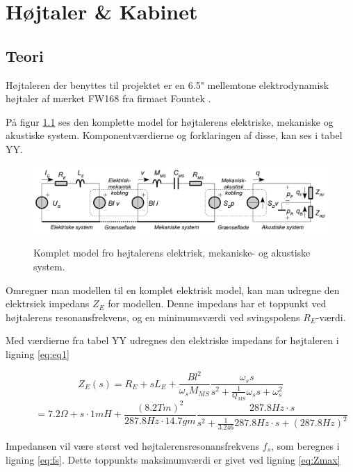 \chapter{Højtaler \& Kabinet}

\section{Teori}
Højtaleren der benyttes til projektet er en 6.5" mellemtone elektrodynamisk højtaler af mærket FW168\cite{FW168} fra firmaet Fountek \cite{Fountek}. 

På figur \ref{fig:kompletmodel} ses den komplette model for højtalerens elektriske, mekaniske og akustiske system.\citep{Elektroakustik} Komponentværdierne og forklaringen af disse, kan ses i tabel YY.

\begin{figure}[H]
	\centering
	\includegraphics[width=\textwidth]{Pics/kompletmodel.PNG}
	\label{fig:kompletmodel}
	\caption{Komplet model fro højtalerens elektrisk, mekaniske- og akustiske system. } 
\end{figure}

Omregner man modellen til en komplet elektrisk model, kan man udregne den elektrsiek impedans $Z_E$ for modellen. Denne impedans har et toppunkt ved højtalerens resonansfrekvens, og en minimumsværdi ved svingspolens $R_E$-værdi.

Med værdierne fra tabel YY udregnes den elektriske impedans for højtaleren i ligning \ref{eq:eq1}

\begin{equation}\label{eq:eq1}
Z_E(s)=R_E+sL_E+\frac{Bl^2}{\omega_s M_{MS}} \frac{ \omega_s s}{ s^2 + \frac{1}{Q_{MS}} \omega_s s + \omega_s^2} \end{equation} \begin{equation} \ \qquad  = 
7.2\Omega + s \cdot 1mH + \frac{(8.2 Tm)^2}{287.8Hz \cdot 14.7gm} \frac{ 287.8Hz \cdot s}{ s^2 + \frac{1}{3.246} 287.8Hz \cdot s + (287.8Hz)^2}  \end{equation}

Impedansen vil være størst ved højtalerensresonansfrekvens $f_s$, som beregnes i ligning \ref{eq:fs}. Dette toppunkts maksimumværdi er givet ved ligning \ref{eq:Zmax} 

